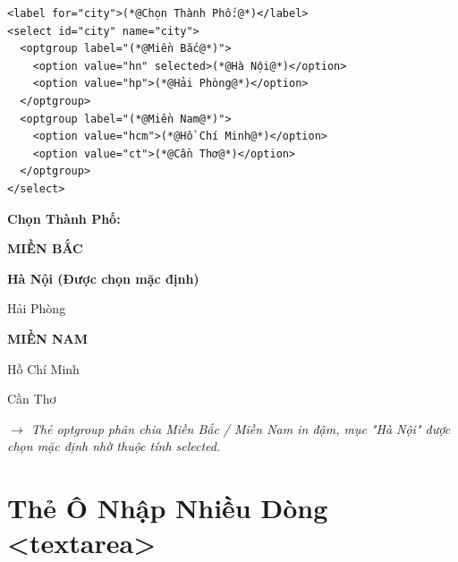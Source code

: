 \documentclass[11pt,oneside]{book}
\begin{document}
\begin{codeWindow}
\begin{lstlisting}[language=HTML5]
<label for="city">(*@Chọn Thành Phố:@*)</label>
<select id="city" name="city">
  <optgroup label="(*@Miền Bắc@*)">
    <option value="hn" selected>(*@Hà Nội@*)</option>
    <option value="hp">(*@Hải Phòng@*)</option>
  </optgroup>
  <optgroup label="(*@Miền Nam@*)">
    <option value="hcm">(*@Hồ Chí Minh@*)</option>
    <option value="ct">(*@Cần Thơ@*)</option>
  </optgroup>
</select>
\end{lstlisting}
\end{codeWindow}

\begin{browserWindow}
\sffamily\small
\begin{center}
\textbf{Chọn Thành Phố:} \par\vspace{4pt}
\begin{tcolorbox}[arc=2pt, colback=white, colframe=primaryBlue!50, boxsep=4pt, width=0.55\linewidth]
  \small
  \textbf{\textcolor{gray!80}{MIỀN BẮC}} \par\vspace{2pt}
  \quad \textcolor{primaryBlue}{\textbf{Hà Nội (Được chọn mặc định)}} \par\vspace{2pt}
  \quad Hải Phòng \par\vspace{3pt}
  \textbf{\textcolor{gray!80}{MIỀN NAM}} \par\vspace{2pt}
  \quad Hồ Chí Minh \par\vspace{2pt}
  \quad Cần Thơ
\end{tcolorbox}
\par\vspace{4pt}
\textcolor{codeComment}{\small\textit{$\rightarrow$ Thẻ optgroup phân chia Miền Bắc / Miền Nam in đậm, mục "Hà Nội" được chọn mặc định nhờ thuộc tính selected.}}
\end{center}
\end{browserWindow}

\section{Thẻ Ô Nhập Nhiều Dòng <textarea>}
\end{document}
